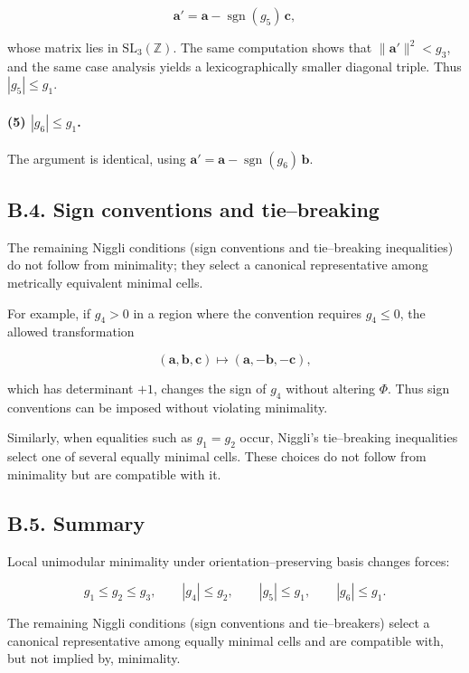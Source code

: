 \documentclass[preprint]{iucr}              %
\numberwithin{equation}{section}
\begin{document}
\[
\mathbf{a}' = \mathbf{a} - \operatorname{sgn}(g_5)\,\mathbf{c},
\]


whose matrix lies in $\mathrm{SL}_3(\mathbb{Z})$.  The same computation
shows that $\|\mathbf{a}'\|^2 < g_3$, and the same case analysis yields a
lexicographically smaller diagonal triple.  Thus $|g_5| \le g_1$.

\paragraph{(5) $|g_6| \le g_1$.}
The argument is identical, using
$\mathbf{a}' = \mathbf{a} - \operatorname{sgn}(g_6)\,\mathbf{b}$.

\subsection*{B.4. Sign conventions and tie–breaking}

The remaining Niggli conditions (sign conventions and tie–breaking
inequalities) do not follow from minimality; they select a canonical
representative among metrically equivalent minimal cells.

For example, if $g_4 > 0$ in a region where the convention requires
$g_4 \le 0$, the allowed transformation


\[
(\mathbf{a},\mathbf{b},\mathbf{c})
\mapsto
(\mathbf{a},-\mathbf{b},-\mathbf{c}),
\]


which has determinant $+1$, changes the sign of $g_4$ without altering
$\Phi$.  Thus sign conventions can be imposed without violating
minimality.

Similarly, when equalities such as $g_1 = g_2$ occur, Niggli’s
tie–breaking inequalities select one of several equally minimal cells.
These choices do not follow from minimality but are compatible with it.

\subsection*{B.5. Summary}

Local unimodular minimality under orientation–preserving basis changes
forces:


\[
g_1 \le g_2 \le g_3,\qquad
|g_4| \le g_2,\qquad
|g_5| \le g_1,\qquad
|g_6| \le g_1.
\]


The remaining Niggli conditions (sign conventions and tie–breakers)
select a canonical representative among equally minimal cells and are
compatible with, but not implied by, minimality.


	
	
	
	
	
\end{document}
